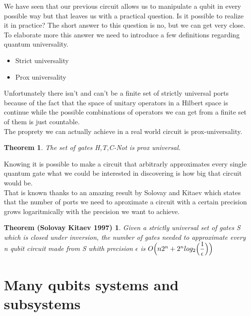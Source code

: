 \documentclass{article}
\newtheorem{Solovay-Kitaev}{Theorem (Solovay Kitaev 1997)}
\newtheorem{Prox-Universal-Set}{Theorem}
\begin{document}
We have seen that our previous circuit allows us to manipulate a qubit
in every possible way but that leaves us with a practical question.
Is it possible to realize it in practice?
The short answer to this question is no, but we can get very close.
To elaborate more this answer we need to introduce a few definitions
regarding quantum universality.
\begin{itemize}

\item
  Strict universality

\item
  Prox universality

\end{itemize}

Unfortunately there isn't and can't be a finite set of strictly
universal
ports because of the fact that the space of unitary operators in a
Hilbert space is continue while the possible combinations of
operators we can get from a finite set of them is just countable.\\
The proprety we can actually achieve in a real world circuit is
prox-universality.\\

\begin{Prox-Universal-Set}
The set of gates {H,T,C-Not} is prox universal.
\end{Prox-Universal-Set}

Knowing it is possible to make a circuit that arbitrarly approximates
every
single quantum gate what we could be interested in discovering is how
big that circuit would be.\\

That is known thanks to an amazing result by Solovay and Kitaev which
states
that the number of ports we need to aproximate a circuit with a certain
precision grows logaritmically with the precision we want to achieve.
  
\begin{Solovay-Kitaev}

  Given a strictly universal set of gates S which is closed under inversion,
  the number of gates needed to approximate every n qubit circuit made
  from S whith precision $\epsilon$ is
  $O\Bigl(n2^n+2^nlog_2 \Bigl( \dfrac{1}{\epsilon}\Bigl)\Bigl)$
  

\end{Solovay-Kitaev}


\newpage

\section{Many qubits systems and subsystems}
\end{document}
